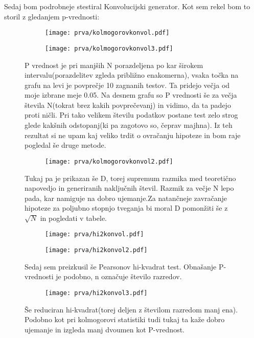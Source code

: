 \documentclass{article}
\begin{document}
Sedaj bom podrobneje stestiral Konvolucijski generator. Kot sem rekel bom to storil z gledanjem p-vrednosti:

\begin{figure}[H]
\centering
\begin{subfigure}{.49\textwidth}
\texttt{[image: prva/kolmogorovkonvol.pdf]}
\end{subfigure}
\begin{subfigure}{.49\textwidth}
\texttt{[image: prva/kolmogorovkonvol3.pdf]}
\end{subfigure}
\caption*{P vrednost je pri manjših N porazdeljena po kar širokem intervalu(porazdelitev zgleda približno enakomerna), vsaka točka na grafu na levi je povprečje 10 zagnanih testov. Ta pridejo večja od moje izbrane meje 0.05. Na desnem grafu so P vrednosti še za večja števila N(tokrat brez kakih povprečevanj) in vidimo, da ta padejo proti ničli. Pri tako velikem številu podatkov postane test zelo strog glede kakšnih odstopanj(ki pa zagotovo so, čeprav majhna). Iz teh rezultat si ne upam kaj veliko trdit o ovračanju hipoteze in bom raje pogledal še druge metode.}
\end{figure}
\begin{figure}[H]
\centering
\begin{subfigure}{.49\textwidth}
\texttt{[image: prva/kolmogorovkonvol2.pdf]}
\end{subfigure}
\caption*{Tukaj pa je prikazan še D, torej supremum razmika med teoretično napovedjo in generiranih naključnih števil. Razmik za večje N lepo pada, kar namiguje na dobro ujemanje.Za natančneje zavračanje hipoteze za poljubno stopnjo tveganja bi moral D pomonžiti še z $\sqrt{N}$ in pogledati v tabele.}
\end{figure}

\begin{figure}[H]
\centering
\begin{subfigure}{.49\textwidth}
\texttt{[image: prva/hi2konvol.pdf]}
\end{subfigure}
\begin{subfigure}{.49\textwidth}
\texttt{[image: prva/hi2konvol2.pdf]}
\end{subfigure}
\caption*{Sedaj sem preizkusil še Pearsonov hi-kvadrat test. Obnašanje P-vrednosti je podobno, n označuje število razredov.}
\end{figure}

\begin{figure}[H]
\centering
\begin{subfigure}{.49\textwidth}
\texttt{[image: prva/hi2konvol3.pdf]}
\end{subfigure}
\caption*{Še reduciran hi-kvadrat(torej deljen z številom razredom manj ena). Podobno kot pri kolmogorovi statistiki tudi tukaj ta kaže dobro ujemanje in izgleda manj dvoumen kot P-vrednost.}
\end{figure}
\end{document}
